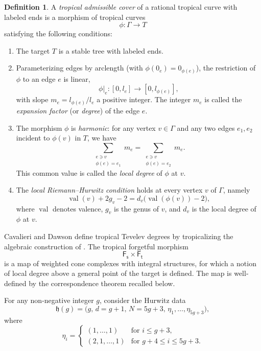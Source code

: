 \documentclass[11pt,reqno]{amsart}
\theoremstyle{definition}
\newtheorem{definition}[theorem]{Definition}
\DeclareMathOperator{\val}{val}
\newcommand{\Ft}{\mathsf{F_t}}
\newcommand{\Fs}{\mathsf{F_s}}
\begin{document}
\begin{definition}
A \emph{tropical admissible cover} of a rational tropical curve with labeled ends
is a morphism of tropical curves
\[
\phi \colon \Gamma \to T
\]
satisfying the following conditions:
\begin{enumerate}
    \item The target $T$ is a stable tree with labeled ends.

    \item Parameterizing edges by arclength (with $\phi(0_e)=0_{\phi(e)}$), the
    restriction of $\phi$ to an edge $e$ is linear,
    \[
        \phi|_e \colon [0,l_e] \to [0,l_{\phi(e)}],
    \]
    with slope
    \(
        m_e = l_{\phi(e)}/l_e
    \)
    a positive integer. The integer $m_e$ is called the \emph{expansion factor}
    (or \emph{degree}) of the edge $e$.

    \item The morphism $\phi$ is \emph{harmonic}: for any vertex $v \in \Gamma$
    and any two edges $e_1,e_2$ incident to $\phi(v)$ in $T$, we have
    \begin{equation}
        \label{eq:localdegree}
        \sum_{\substack{e \ni v \\ \phi(e)=e_1}} m_e
        =
        \sum_{\substack{e \ni v \\ \phi(e)=e_2}} m_e .
    \end{equation}
    This common value is called the \emph{local degree} of $\phi$ at $v$.

    \item The \emph{local Riemann--Hurwitz condition} holds at every vertex $v$ of
    $\Gamma$, namely
    \[
        \val(v) + 2g_v - 2
        =
        d_v \bigl( \val(\phi(v)) - 2 \bigr),
    \]
    where $\val$ denotes valence, $g_v$ is the genus of $v$, and $d_v$ is the local
    degree of $\phi$ at $v$.
\end{enumerate}
\end{definition}

Cavalieri and Dawson define tropical Tevelev degrees by tropicalizing the
algebraic construction of \cite{CPS:Tevdeg}. The tropical forgetful morphism
\[
\Fs \times \Ft
\]
is a map of weighted cone complexes with integral structures, for which a notion
of local degree above a general point of the target is defined. The map is
well-defined by the correspondence theorem recalled below.

For any non-negative integer $g$, consider the Hurwitz data
\begin{equation}
    \label{eq:hd}
    \mathfrak{h}(g)
    =
    \bigl(g,\, d=g+1,\, N=5g+3,\, \eta_1,\ldots,\eta_{5g+3}\bigr),
\end{equation}
where
\[
\eta_i =
\begin{cases}
    (1,\ldots,1) & \text{for } i \le g+3, \\
    (2,1,\ldots,1) & \text{for } g+4 \le i \le 5g+3.
\end{cases}
\]
\end{document}
